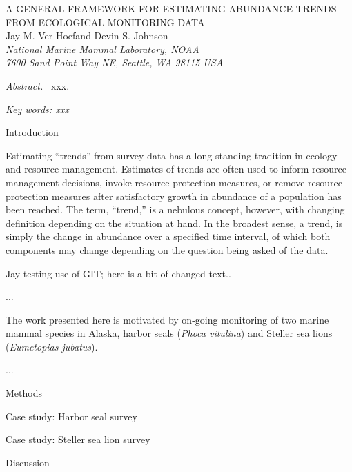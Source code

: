 \documentclass[12pt,letter]{report}
\begin{document}
\begin{center}
\Large A GENERAL FRAMEWORK FOR ESTIMATING ABUNDANCE TRENDS FROM ECOLOGICAL MONITORING DATA
\bigskip\\
\normalsize
{\sc Jay M. Ver Hoef\footnotemark[1] and Devin S. Johnson}\smallskip\\
{\em National Marine Mammal Laboratory, NOAA\\
7600 Sand Point Way NE, Seattle,
WA 98115 USA }\\ \medskip
\end{center}

\raggedright \setlength{\parindent}{0.3in}
\renewcommand{\baselinestretch}{1.7}\normalsize
{}
 \linenumbers

{\em Abstract.\ } xxx.

{\em Key words: xxx}

\centerline{\sc Introduction}

Estimating ``trends'' from survey data has a long standing tradition in ecology and resource management. Estimates of trends are often used to inform resource management decisions, invoke resource protection measures, or remove resource protection measures after satisfactory growth in abundance of a population has been reached. The term, ``trend,'' is a nebulous concept, however, with changing definition depending on the situation at hand. In the broadest sense, a trend, is simply the change in abundance over a specified time interval, of which both components may change depending on the question being asked of the data.   

Jay testing use of GIT; here is a bit of changed text..

...

The work presented here is motivated by on-going monitoring of two marine mammal species in Alaska, harbor seals ({\it Phoca vitulina}) and Steller sea lions ({\it Eumetopias jubatus}).

...
   
\centerline{\sc Methods}

\centerline{\sc Case study: Harbor seal survey}

\centerline{\sc Case study: Steller sea lion survey}

\centerline{\sc Discussion}
\end{document}
